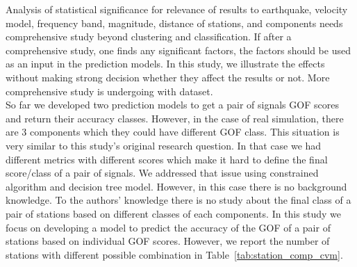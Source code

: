 Analysis of statistical significance for relevance of results to earthquake, velocity model, frequency band, magnitude, distance of stations, and components needs comprehensive study beyond clustering and classification. If after a comprehensive study, one finds any significant factors, the factors should be used as an input in the prediction models. In this study, we illustrate the effects without making strong decision whether they affect the results or not. More comprehensive study is undergoing with \citet{Taborda_2016_GJI} dataset. \\

So far we developed two prediction models to get a pair of signals GOF scores and return their accuracy classes. However, in the case of real simulation, there are 3 components which they could have different GOF class. This situation is very similar to this study's original research question. In that case we had different metrics with different scores which make it hard to define the final score/class of a pair of signals. We addressed that issue using constrained \kmeans{} algorithm and decision tree model. However, in this case there is no background knowledge. To the authors' knowledge there is no study about the final class of a pair of stations based on different classes of each components. In this study we focus on developing a model to predict the accuracy of the GOF of a pair of stations based on individual GOF scores. However, we report the number of stations with different possible combination in Table~\ref{tab:station_comp_cvm}.

